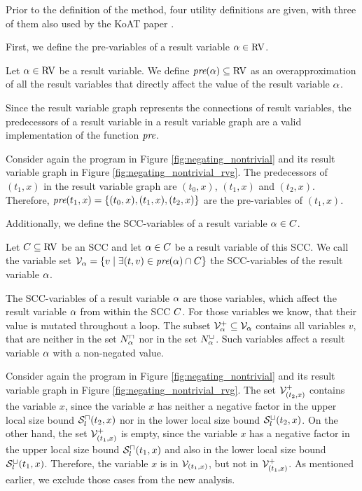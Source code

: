 Prior to the definition of the method, four utility definitions are given, with three of them also used by the KoAT paper \cite{koat}.

First, we define the pre-variables of a result variable $\alpha \in \text{RV}$.
\begin{definition}
  Let $\alpha \in \text{RV}$ be a result variable.
  We define $\emph{pre}(\alpha) \subseteq \text{RV}$ as an overapproximation of all the result variables that directly affect the value of the result variable $\alpha$.
\end{definition}
Since the result variable graph represents the connections of result variables, the predecessors of a result variable in a result variable graph are a valid implementation of the function $\emph{pre}$.
\begin{example}
  Consider again the program in Figure \ref{fig:negating_nontrivial} and its result variable graph in Figure \ref{fig:negating_nontrivial_rvg}.
  The predecessors of $(t_1,x)$ in the result variable graph are $(t_0,x)$, $(t_1,x)$ and $(t_2,x)$.
  Therefore, $\emph{pre}(t_1,x) = \lbrace (t_0,x), (t_1,x), (t_2,x) \rbrace$ are the pre-variables of $(t_1,x)$.
\end{example}

Additionally, we define the SCC-variables of a result variable $\alpha \in C$.
\begin{definition}
  Let $C \subseteq \text{RV}$ be an SCC and let $\alpha \in C$ be a result variable of this SCC.
  We call the variable set $\mathcal{V}_\alpha = \lbrace  v \mid \exists (t, v) \in \emph{pre}(\alpha) \cap C  \rbrace$ the SCC-variables of the result variable $\alpha$.
\end{definition}
The SCC-variables of a result variable $\alpha$ are those variables, which affect the result variable $\alpha$ from within the SCC $C$.
For those variables we know, that their value is mutated throughout a loop.
The subset $\mathcal{V}^+_\alpha \subseteq \mathcal{V}_\alpha$ contains all variables $v$, that are neither in the set $N^\sqcap_\alpha$ nor in the set $N^\sqcup_\alpha$.
Such variables affect a result variable $\alpha$ with a non-negated value.
\begin{example}
  Consider again the program in Figure \ref{fig:negating_nontrivial} and its result variable graph in Figure \ref{fig:negating_nontrivial_rvg}.
  The set $\mathcal{V}^+_{(t_2,x)}$ contains the variable $x$, since the variable $x$ has neither a negative factor in the upper local size bound ${\mathcal{S}^\sqcap_l}(t_2,x)$ nor in the lower local size bound ${\mathcal{S}^\sqcup_l}(t_2,x)$.
  On the other hand, the set $\mathcal{V}^+_{(t_1,x)}$ is empty, since the variable $x$ has a negative factor in the upper local size bound ${\mathcal{S}^\sqcap_l}(t_1,x)$ and also in the lower local size bound ${\mathcal{S}^\sqcup_l}(t_1,x)$.
  Therefore, the variable $x$ is in $\mathcal{V}_{(t_1,x)}$, but not in $\mathcal{V}^+_{(t_1,x)}$.
  As mentioned earlier, we exclude those cases from the new analysis.
\end{example}

